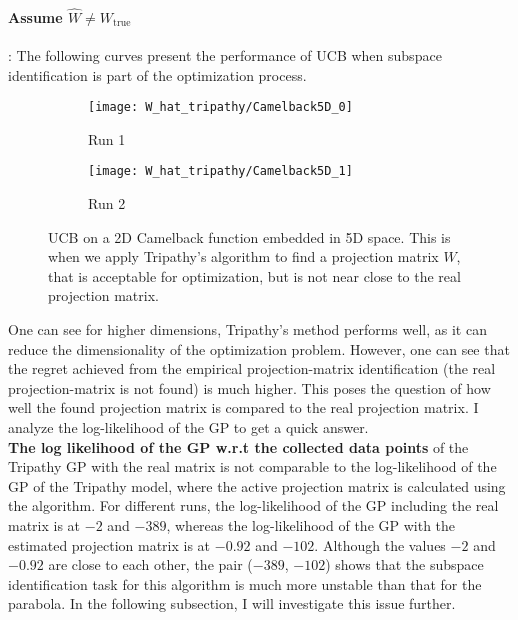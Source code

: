 \paragraph{Assume $\hat{W} \neq W_{\text{true}}$}: The following curves present the performance of UCB when subspace identification is part of the optimization process.

\begin{figure}[H]
    \centering
    \begin{subfigure}[b]{0.40\textwidth}
        \texttt{[image: W\_hat\_tripathy/Camelback5D\_0]}
        \label{fig:gull}
        \caption{Run 1}
    \end{subfigure}
    \begin{subfigure}[b]{0.40\textwidth}
        \texttt{[image: W\_hat\_tripathy/Camelback5D\_1]}
        \label{fig:tiger}
        \caption{Run 2}
    \end{subfigure}   
           \caption{UCB on a 2D Camelback function embedded in 5D space.
  This is when we apply Tripathy's algorithm to find a projection matrix $W$, that is acceptable for optimization, but is not near close to the real projection matrix.}
\end{figure}

One can see for higher dimensions, Tripathy's method performs well, as it can reduce the dimensionality of the optimization problem.
However, one can see that the regret achieved from the empirical projection-matrix identification (the real projection-matrix is not found) is much higher.
This poses the question of how well the found projection matrix is compared to the real projection matrix.
I analyze the log-likelihood of the GP to get a quick answer. \\

\textbf{The log likelihood of the GP w.r.t the collected data points} of the Tripathy GP with the real matrix is not comparable to the log-likelihood of the GP of the Tripathy model, where the active projection matrix is calculated using the algorithm.
For different runs, the log-likelihood of the GP including the real matrix is at $-2$ and $-389$, whereas the log-likelihood of the GP with the estimated projection matrix is at $-0.92$ and $-102$. 
Although the values $-2$ and $-0.92$ are close to each other, the pair ($-389$, $-102$) shows that the subspace identification task for this algorithm is much more unstable than that for the parabola.
In the following subsection, I will investigate this issue further.

